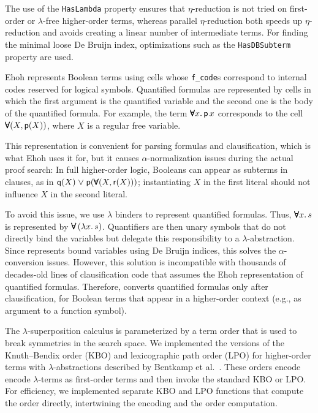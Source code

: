 The use of the \texttt{HasLambda} property ensures that $\eta$-reduction is not
tried on first-order or $\lambda$-free higher-order terms, whereas parallel
$\eta$-reduction both speeds up $\eta$-reduction and avoids creating a linear
number of intermediate terms. For finding the minimal loose De Bruijn index,
optimizations such as the \texttt{HasDBSub\-term} property are used.

Ehoh represents Boolean terms using
cells whose \texttt{f\_code}s correspond to internal codes reserved
for logical symbols. Quantified formulas are represented by cells in which the
first argument is the quantified variable and the second one is the body of the
quantified formula. For example, the term $\pmb\forall x.\, \mathsf{p} \, x$ corresponds
to the cell $\pmb\forall(X, \mathsf{p}(X))$, where $X$ is a regular free variable.

This representation is convenient for parsing formulas and clausification, which
is what Ehoh uses it for, but it
causes $\alpha$-normalization issues during the actual proof search: In
full higher-order logic, Booleans can appear as subterms in clauses, as in
$\mathsf{q}(X) \mathrel\lor \mathsf{p}(\pmb\forall(X, \mathsf{r}(X)))$;
instantiating $X$ in the first literal should not influence $X$ in the second
literal.

To avoid this issue, we use $\lambda$ binders to represent quantified formulas.
Thus, $\pmb\forall x. \, s$ is represented by $\pmb\forall \, (\lambda x. \, s)$.
Quantifiers are then unary symbols that do not directly bind
the variables but delegate this responsibility to a $\lambda$-abstraction.
%
Since \ehohii{} represents bound variables using De Bruijn indices, this solves the
$\alpha$-conversion issues. However, this solution is incompatible with
thousands of decades-old lines of clausification code that assumes the Ehoh
representation of
quantified formulas. Therefore, \ehohii{} converts quantified
formulas only after clausification, for Boolean terms that appear in a
higher-order context (e.g., as argument to a function symbol).

The $\lambda$-superposition calculus is parameterized by a term order that is
used to break symmetries in the search space.
We implemented the versions of the Knuth--Bendix order (KBO) and lexicographic
path order (LPO) for higher-order terms with $\lambda$-abstractions described by
Bentkamp et al.~\cite{bbtv-21-full-ho-sup}. These orders encode
encode $\lambda$-terms as first-order terms and then invoke the standard KBO or
LPO. %
For efficiency, we implemented separate KBO and
LPO functions that compute the order directly, intertwining the encoding and
the order computation.

